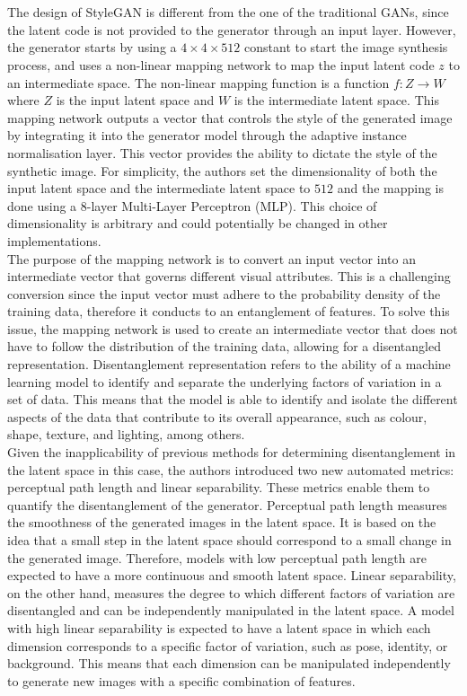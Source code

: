 \\ \\
The design of StyleGAN is different from the one of the traditional GANs, since the latent code is not provided to the generator through an input layer. However, the generator starts by using a $4\times4\times512$ constant to start the image synthesis process, and uses a non-linear mapping network to map the input latent code $z$ to an intermediate space. The non-linear mapping function is a function $f:Z\rightarrow W$ where $Z$ is the input latent space and $W$ is the intermediate latent space. This mapping network outputs a vector that controls the style of the generated image by integrating it into the generator model through the adaptive instance normalisation layer. This vector provides the ability to dictate the style of the synthetic image.
For simplicity, the authors set the dimensionality of both the input latent space and the intermediate latent space to $512$ and the mapping is done using a $8$-layer Multi-Layer Perceptron (MLP). This choice of dimensionality is arbitrary and could potentially be changed in other implementations.\\
The purpose of the mapping network is to convert an input vector into an intermediate vector that governs different visual attributes. This is a challenging conversion since the input vector must adhere to the probability density of the training data, therefore it conducts to an entanglement of features. To solve this issue, the mapping network is used to create an intermediate vector that does not have to follow the distribution of the training data, allowing for a disentangled representation. Disentanglement representation refers to the ability of a machine learning model to identify and separate the underlying factors of variation in a set of data. This means that the model is able to identify and isolate the different aspects of the data that contribute to its overall appearance, such as colour, shape, texture, and lighting, among others. \\
Given the inapplicability of previous methods for determining disentanglement in the latent space in this case, the authors introduced two new automated metrics: perceptual path length and linear separability. These metrics enable them to quantify the disentanglement of the generator. Perceptual path length measures the smoothness of the generated images in the latent space. It is based on the idea that a small step in the latent space should correspond to a small change in the generated image. Therefore, models with low perceptual path length are expected to have a more continuous and smooth latent space. Linear separability, on the other hand, measures the degree to which different factors of variation are disentangled and can be independently manipulated in the latent space. A model with high linear separability is expected to have a latent space in which each dimension corresponds to a specific factor of variation, such as pose, identity, or background. This means that each dimension can be manipulated independently to generate new images with a specific combination of features.\\
